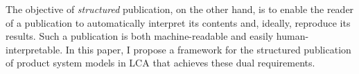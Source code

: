 The objective of \textit{structured} publication, on the other hand, is to enable the reader of a publication to automatically interpret its contents and, ideally, reproduce its results.  Such a publication is both machine-readable and easily human-interpretable.  In this paper, I propose a framework for the structured publication of product system models in LCA that achieves these dual requirements.  


\cruft




